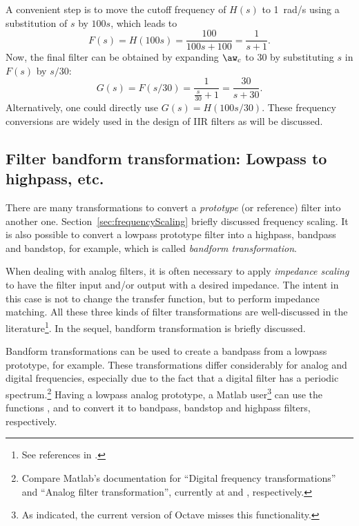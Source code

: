 A convenient step is to move the cutoff frequency of $H(s)$ to 1~rad/s using
a substitution of $s$ by $100s$, which leads to
\[
F(s) = H(100s)=\frac{100}{100s+100} = \frac{1}{s+1}.
\]
Now, the final filter can be obtained by expanding $\aw_c$ to 30 by substituting
$s$ in $F(s)$ by $s/30$:
\[
G(s) = F(s/30) = \frac{1}{\frac{s}{30}+1} = \frac{30}{s+30}.
\]
Alternatively, one could directly use $G(s)=H(100s/30)$.
These frequency conversions are widely used in the design of IIR filters as will be discussed.
\eExample

\subsection{Filter bandform transformation: Lowpass to highpass, etc.}

There are many transformations to convert a \emph{prototype} (or reference) filter into another one. 
Section~\ref{sec:frequencyScaling} briefly discussed frequency scaling.
It is also possible to convert a lowpass prototype filter into a highpass, bandpass and bandstop, for example, which is called \emph{bandform transformation}. 

When dealing with analog filters, it is often necessary to apply \emph{impedance scaling} to have the filter input and/or output with a desired impedance. The intent in this case is not to change the transfer function, but to perform impedance matching. All these three kinds of filter transformations are well-discussed in the literature\footnote{See references in .}. In the sequel, bandform transformation is briefly discussed.

Bandform transformations can be used to create a bandpass from a lowpass prototype, for example. These transformations differ considerably for analog and digital frequencies, especially due to the fact that a digital filter has a periodic spectrum.\footnote{Compare Matlab's documentation for ``Digital frequency transformations'' and ``Analog filter transformation'', currently at  and  , respectively.} Having a lowpass analog prototype, a Matlab user\footnote{As indicated, the current version of Octave misses this functionality.} can use the functions ,  and  to convert it to bandpass, bandstop and highpass filters, respectively. 

